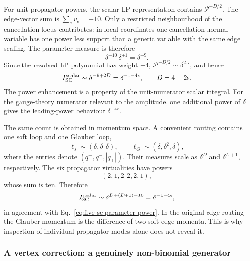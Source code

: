 \documentclass[a4paper,11pt]{article}
\begin{document}
For unit propagator powers, the scalar LP representation contains
\(\mathcal P^{-D/2}\).  The edge-vector sum is
\(\sum_e v_e=-10\).  Only a restricted neighbourhood of the cancellation
locus contributes: in local coordinates one cancellation-normal variable
has one power less support than a generic variable with the same edge
scaling.  The parameter measure is therefore
\begin{equation}
 \delta^{-10}\,\delta^{+1}=\delta^{-9}.
 \label{eq:five-sc-parameter-measure}
\end{equation}
Since the resolved LP polynomial has weight \(-4\),
\(\mathcal P^{-D/2}\sim\delta^{2D}\), and hence
\begin{equation}
 I_{\rm SC}^{\rm scalar}\sim
 \delta^{-9+2D}=\delta^{-1-4\epsilon},
 \qquad D=4-2\epsilon.
 \label{eq:five-sc-parameter-power}
\end{equation}
The power enhancement is a property of the unit-numerator scalar integral.
For the gauge-theory numerator relevant to the amplitude, one additional
power of \(\delta\) gives the leading-power behaviour
\(\delta^{-4\epsilon}\).

The same count is obtained in momentum space.  A convenient routing contains
one soft loop and one Glauber loop,
\begin{equation}
 \ell_s\sim(\delta,\delta,\delta),
 \qquad
 \ell_G\sim(\delta,\delta^2,\delta),
 \label{eq:five-sc-modes}
\end{equation}
where the entries denote \((q^+,q^-,|q_\perp|)\).  Their measures scale as
\(\delta^D\) and \(\delta^{D+1}\), respectively.  The six propagator
virtualities have powers
\begin{equation}
 (2,1,2,2,2,1),
 \label{eq:five-sc-virtualities}
\end{equation}
whose sum is ten.  Therefore
\begin{equation}
 I_{\rm SC}^{\rm scalar}\sim
 \delta^{D+(D+1)-10}=\delta^{-1-4\epsilon},
 \label{eq:five-sc-momentum-power}
\end{equation}
in agreement with Eq.~\eqref{eq:five-sc-parameter-power}.  In the original
edge routing the Glauber momentum is the difference of two soft edge
momenta.  This is why inspection of individual propagator modes alone does
not reveal it.

\subsubsection{A vertex correction: a genuinely non-binomial generator}
\end{document}
